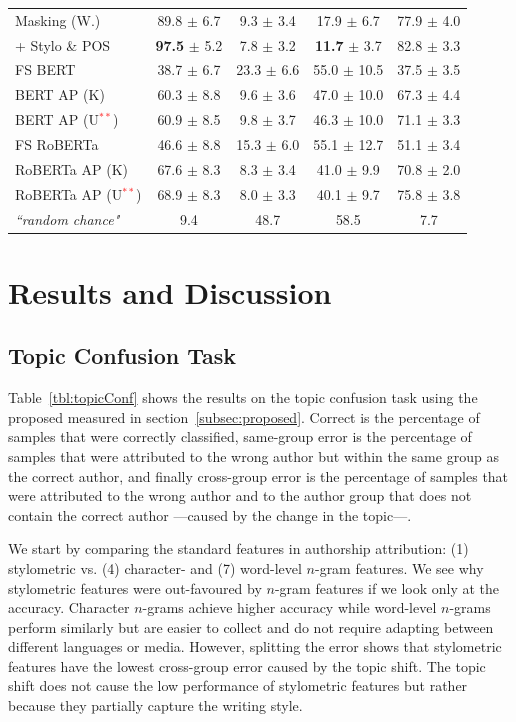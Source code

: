 \documentclass[11pt]{article}
\begin{document}
\begin{table}[htb]
\begin{tabular}{l|ccc|||c}
 Masking (W.)  & 89.8 $\pm$ 6.7 & 9.3 $\pm$ 3.4 & 17.9 $\pm$ 6.7 & 77.9 $\pm$ 4.0\\
 \phantom{hi}+ Stylo \& POS & \textbf{97.5} $\pm$ 5.2 & 7.8 $\pm$ 3.2 & \textbf{11.7} $\pm$ 3.7 & 82.8 $\pm$ 3.3\\

\hline \hline
 FS BERT   & 38.7 $\pm$ 6.7 & 23.3  $\pm$ 6.6 & 55.0  $\pm$ 10.5 & 37.5 $\pm$ 3.5\\
 BERT AP (K) & 60.3 $\pm$ 8.8 & 9.6 $\pm$ 3.6 & 47.0 $\pm$ 10.0 & 67.3 $\pm$ 4.4\\
 BERT AP (U\textcolor{red}{$^{**}$}) & 60.9 $\pm$ 8.5 & 9.8 $\pm$ 3.7 & 46.3 $\pm$ 10.0 & 71.1 $\pm$ 3.3\\

\hline
 FS RoBERTa & 46.6 $\pm$ 8.8 & 15.3 $\pm$ 6.0 & 55.1 $\pm$ 12.7 & 51.1 $\pm$ 3.4\\
 RoBERTa AP (K) & 67.6 $\pm$ 8.3 & 8.3 $\pm$ 3.4 & 41.0 $\pm$ 9.9 & 70.8 $\pm$ 2.0\\
 RoBERTa AP (U\textcolor{red}{$^{**}$}) & 68.9 $\pm$ 8.3 & 8.0 $\pm$ 3.3 & 40.1 $\pm$ 9.7 & 75.8 $\pm$ 3.8\\

\hline\hline
 \multirow{1}{*}{\textit{``random chance"}} & 9.4 & 48.7 & 58.5 & 7.7\\\hline
\end{tabular}

\end{table}

\section{Results and Discussion}
\subsection{Topic Confusion Task}
Table~\ref{tbl:topicConf} shows the results on the topic confusion task using the proposed measured in section~\ref{subsec:proposed}. Correct is the percentage of samples that were correctly classified, same-group error is the percentage of samples that were attributed to the wrong author but within the same group as the correct author, and finally cross-group error is the percentage of samples that were attributed to the wrong author and to the author group that does not contain the correct author ---caused by the change in the topic---. 

We start by comparing the standard features in authorship attribution: (1) stylometric vs. (4) character- and (7) word-level $n$-gram features. We see why stylometric features were out-favoured by $n$-gram features if we look only at the accuracy. Character $n$-grams achieve higher accuracy while word-level $n$-grams perform similarly but are easier to collect and do not require adapting between different languages or media. However, splitting the error shows that stylometric features have the lowest cross-group error caused by the topic shift. The topic shift does not cause the low performance of stylometric features but rather because they partially capture the writing style.
\end{document}
